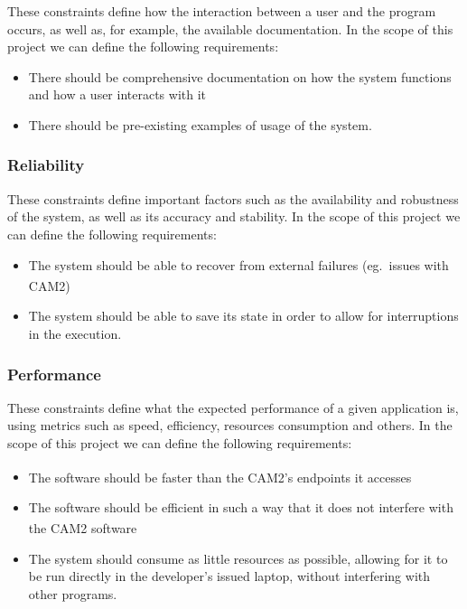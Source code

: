 These constraints define how the interaction between a user and the program occurs, as well as, for example, the available documentation. In the scope of this project we can define the following requirements:

\begin{itemize}
	\item There should be comprehensive documentation on how the system functions and how a user interacts with it
	\item There should be pre-existing examples of usage of the system.
\end{itemize}

\subsubsection{Reliability}

These constraints define important factors such as the availability and robustness of the system, as well as its accuracy and stability. In the scope of this project we can define the following requirements:

\begin{itemize}
	\item The system should be able to recover from external failures (eg.\ issues with CAM2\textsuperscript{\textregistered})
	\item The system should be able to save its state in order to allow for interruptions in the execution.
\end{itemize}

\subsubsection{Performance}

These constraints define what the expected performance of a given application is, using metrics such as speed, efficiency, resources consumption and others. In the scope of this project we can define the following requirements:

\begin{itemize}
	\item The software should be faster than the CAM2\textsuperscript{\textregistered}'s endpoints it accesses
	\item The software should be efficient in such a way that it does not interfere with the CAM2\textsuperscript{\textregistered} software
	\item The system should consume as little resources as possible, allowing for it to be run directly in the developer's issued laptop, without interfering with other programs.
\end{itemize}

